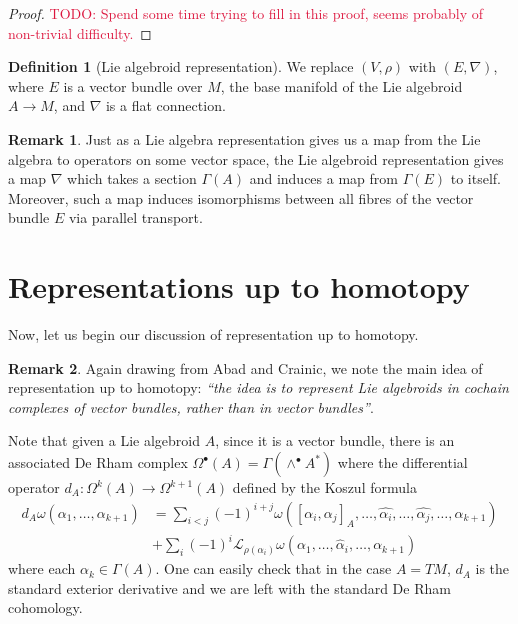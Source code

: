\documentclass[aps,pra,showpacs,notitlepage,onecolumn,superscriptaddress,nofootinbib]{revtex4-1}
\newcommand{\pop}[1]{\textcolor{crimson}{#1}}
\theoremstyle{definition}
\newtheorem{definition}{Definition}[section]
\newtheorem{remark}{Remark}[section]
\begin{document}
\begin{proof}
    \pop{TODO: Spend some time trying to fill in this proof, seems probably of non-trivial difficulty.}
\end{proof}

\begin{definition}[Lie algebroid representation]
    We replace $(V, \rho)$ with $(E, \nabla)$, where $E$ is a vector bundle over $M$, the base manifold of the Lie algebroid $A \rightarrow M$, and $\nabla$ is a flat connection.
\end{definition}

\begin{remark}
    Just as a Lie algebra representation gives us a map from the Lie algebra to operators on some vector space, the Lie algebroid representation gives a map $\nabla$ which 
    takes a section $\Gamma(A)$ and induces a map from $\Gamma(E)$ to itself. Moreover, such a map induces isomorphisms between all fibres of the vector bundle $E$ via parallel transport.
\end{remark}

\section{Representations up to homotopy}

\noindent Now, let us begin our discussion of representation up to homotopy.

\begin{remark}
    Again drawing from Abad and Crainic, we note the main idea of representation up to homotopy: \emph{``the idea is to represent
    Lie algebroids in cochain complexes of vector bundles, rather than in vector bundles''}.
\end{remark}

Note that given a Lie algebroid $A$, since it is a vector bundle, there is an associated De Rham complex $\Omega^{\bullet}(A) = \Gamma(\wedge^{\bullet} A^{*})$ where 
the differential operator $d_A : \Omega^{k}(A) \rightarrow \Omega^{k + 1}(A)$ defined by the Koszul formula
\begin{align}
    d_A \omega(\alpha_1, \dots, \alpha_{k + 1}) &= \sum_{i < j} (-1)^{i + j} \omega([\alpha_i, \alpha_j]_A, \dots, \widehat{\alpha_i}, \dots, \widehat{\alpha_j}, \dots, \alpha_{k + 1}) 
    \\ &+ \sum_{i} (-1)^{i} \mathcal{L}_{\rho(\alpha_i)} \omega(\alpha_1, \dots, \widehat{\alpha}_i, \dots, \alpha_{k + 1})
\end{align}
where each $\alpha_k \in \Gamma(A)$. One can easily check that in the case $A = TM$, $d_A$ is the standard exterior derivative and we are left with the standard De Rham cohomology.
\end{document}
